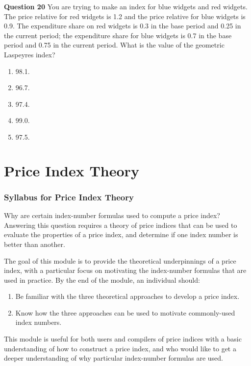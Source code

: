 \documentclass[
]{article}
\begin{document}
\textbf{Question 20} You are trying to make an index for blue widgets and red widgets. The price relative for red widgets is 1.2 and the price relative for blue widgets is 0.9. The expenditure share on red widgets is 0.3 in the base period and 0.25 in the current period; the expenditure share for blue widgets is 0.7 in the base period and 0.75 in the current period. What is the value of the geometric Laspeyres index?

\begin{enumerate}
\def\labelenumi{\alph{enumi})}
\item
  98.1.
\item
  96.7.
\item
  97.4.
\item
  99.0.
\item
  97.5.
\end{enumerate}

\hypertarget{part-price-index-theory}{%
\part{Price Index Theory}\label{part-price-index-theory}}

\hypertarget{syllabus-for-price-index-theory}{%
\section{Syllabus for Price Index Theory}\label{syllabus-for-price-index-theory}}

Why are certain index-number formulas used to compute a price index? Answering this question requires a theory of price indices that can be used to evaluate the properties of a price index, and determine if one index number is better than another.

The goal of this module is to provide the theoretical underpinnings of a price index, with a particular focus on motivating the index-number formulas that are used in practice. By the end of the module, an individual should:

\begin{enumerate}
\def\labelenumi{\arabic{enumi}.}
\item
  Be familiar with the three theoretical approaches to develop a price index.
\item
  Know how the three approaches can be used to motivate commonly-used index numbers.
\end{enumerate}

This module is useful for both users and compilers of price indices with a basic understanding of how to construct a price index, and who would like to get a deeper understanding of why particular index-number formulas are used.
\end{document}
